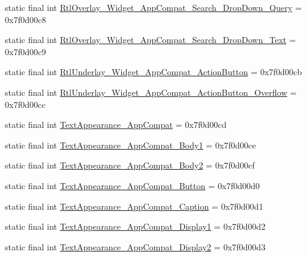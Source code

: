 \begin{DoxyCompactItemize}
\item 
static final int \mbox{\hyperlink{classandroid_1_1support_1_1design_1_1R_1_1style_af5d79a9f7bda95a6bb733e4e50aeae28}{Rtl\+Overlay\+\_\+\+Widget\+\_\+\+App\+Compat\+\_\+\+Search\+\_\+\+Drop\+Down\+\_\+\+Query}} = 0x7f0d00c8
\item 
static final int \mbox{\hyperlink{classandroid_1_1support_1_1design_1_1R_1_1style_a09f6359f265a6b5412de4226637340cb}{Rtl\+Overlay\+\_\+\+Widget\+\_\+\+App\+Compat\+\_\+\+Search\+\_\+\+Drop\+Down\+\_\+\+Text}} = 0x7f0d00c9
\item 
static final int \mbox{\hyperlink{classandroid_1_1support_1_1design_1_1R_1_1style_af006a927e9fcf9187ad094601c2fd979}{Rtl\+Underlay\+\_\+\+Widget\+\_\+\+App\+Compat\+\_\+\+Action\+Button}} = 0x7f0d00cb
\item 
static final int \mbox{\hyperlink{classandroid_1_1support_1_1design_1_1R_1_1style_aaa94611b0f8dda49a6a2a8ad7ecb9b97}{Rtl\+Underlay\+\_\+\+Widget\+\_\+\+App\+Compat\+\_\+\+Action\+Button\+\_\+\+Overflow}} = 0x7f0d00cc
\item 
static final int \mbox{\hyperlink{classandroid_1_1support_1_1design_1_1R_1_1style_a150f94913f3a6732ce3ba8a8afdd1e3a}{Text\+Appearance\+\_\+\+App\+Compat}} = 0x7f0d00cd
\item 
static final int \mbox{\hyperlink{classandroid_1_1support_1_1design_1_1R_1_1style_a8ed35c1c1c7ff1e4555efdd939993b32}{Text\+Appearance\+\_\+\+App\+Compat\+\_\+\+Body1}} = 0x7f0d00ce
\item 
static final int \mbox{\hyperlink{classandroid_1_1support_1_1design_1_1R_1_1style_a984f35eb8517130ee3bb9c77f4db3d6b}{Text\+Appearance\+\_\+\+App\+Compat\+\_\+\+Body2}} = 0x7f0d00cf
\item 
static final int \mbox{\hyperlink{classandroid_1_1support_1_1design_1_1R_1_1style_abb6ae1be3e2e1bd68fd51e2d090dbb82}{Text\+Appearance\+\_\+\+App\+Compat\+\_\+\+Button}} = 0x7f0d00d0
\item 
static final int \mbox{\hyperlink{classandroid_1_1support_1_1design_1_1R_1_1style_a7beee5ea7f39ff6f540899b876335d06}{Text\+Appearance\+\_\+\+App\+Compat\+\_\+\+Caption}} = 0x7f0d00d1
\item 
static final int \mbox{\hyperlink{classandroid_1_1support_1_1design_1_1R_1_1style_a3d7fcc642e94e5d0da4cc0eb050d4377}{Text\+Appearance\+\_\+\+App\+Compat\+\_\+\+Display1}} = 0x7f0d00d2
\item 
static final int \mbox{\hyperlink{classandroid_1_1support_1_1design_1_1R_1_1style_a5119c9d4d6b9119f974c3cc3d3274622}{Text\+Appearance\+\_\+\+App\+Compat\+\_\+\+Display2}} = 0x7f0d00d3

\end{DoxyCompactItemize}
